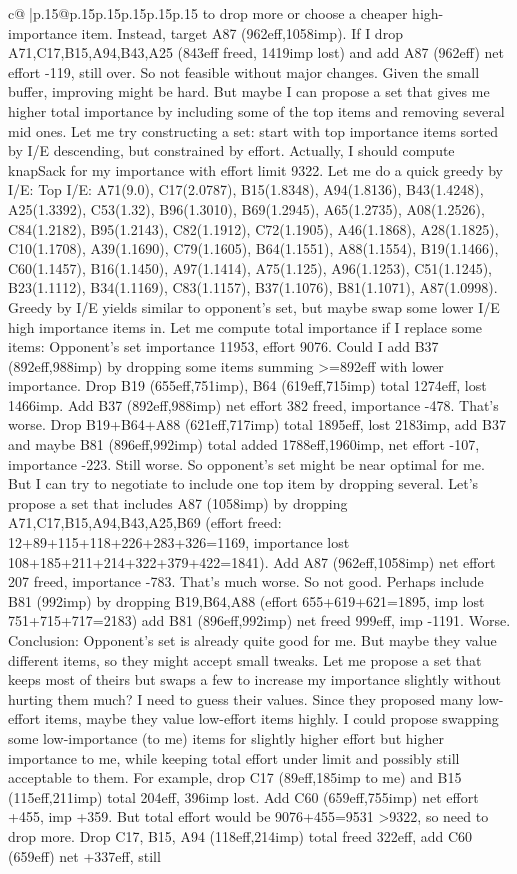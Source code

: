 \documentclass{article}
\begin{document}
{\begin{supertabular}{c@{$\;$}|p{.15\linewidth}@{}p{.15\linewidth}p{.15\linewidth}p{.15\linewidth}p{.15\linewidth}p{.15\linewidth}}
{{{to drop more or choose a cheaper high{-}importance item. Instead, target A87 (962eff,1058imp). If I drop A71,C17,B15,A94,B43,A25 (843eff freed, 1419imp lost) and add A87 (962eff) net effort {-}119, still over. So not feasible without major changes. Given the small buffer, improving might be hard. But maybe I can propose a set that gives me higher total importance by including some of the top items and removing several mid ones. Let me try constructing a set: start with top importance items sorted by I/E descending, but constrained by effort. Actually, I should compute knapSack for my importance with effort limit 9322. Let me do a quick greedy by I/E: Top I/E: A71(9.0), C17(2.0787), B15(1.8348), A94(1.8136), B43(1.4248), A25(1.3392), C53(1.32), B96(1.3010), B69(1.2945), A65(1.2735), A08(1.2526), C84(1.2182), B95(1.2143), C82(1.1912), C72(1.1905), A46(1.1868), A28(1.1825), C10(1.1708), A39(1.1690), C79(1.1605), B64(1.1551), A88(1.1554), B19(1.1466), C60(1.1457), B16(1.1450), A97(1.1414), A75(1.125), A96(1.1253), C51(1.1245), B23(1.1112), B34(1.1169), C83(1.1157), B37(1.1076), B81(1.1071), A87(1.0998). Greedy by I/E yields similar to opponent’s set, but maybe swap some lower I/E high importance items in. Let me compute total importance if I replace some items: Opponent’s set importance 11953, effort 9076. Could I add B37 (892eff,988imp) by dropping some items summing >=892eff with lower importance. Drop B19 (655eff,751imp), B64 (619eff,715imp) total 1274eff, lost 1466imp. Add B37 (892eff,988imp) net effort 382 freed, importance {-}478. That’s worse. Drop B19+B64+A88 (621eff,717imp) total 1895eff, lost 2183imp, add B37 and maybe B81 (896eff,992imp) total added 1788eff,1960imp, net effort {-}107, importance {-}223. Still worse. So opponent’s set might be near optimal for me. But I can try to negotiate to include one top item by dropping several. Let’s propose a set that includes A87 (1058imp) by dropping A71,C17,B15,A94,B43,A25,B69 (effort freed: 12+89+115+118+226+283+326=1169, importance lost 108+185+211+214+322+379+422=1841). Add A87 (962eff,1058imp) net effort 207 freed, importance {-}783. That’s much worse. So not good. Perhaps include B81 (992imp) by dropping B19,B64,A88 (effort 655+619+621=1895, imp lost 751+715+717=2183) add B81 (896eff,992imp) net freed 999eff, imp {-}1191. Worse. Conclusion: Opponent’s set is already quite good for me. But maybe they value different items, so they might accept small tweaks. Let me propose a set that keeps most of theirs but swaps a few to increase my importance slightly without hurting them much? I need to guess their values. Since they proposed many low{-}effort items, maybe they value low{-}effort items highly. I could propose swapping some low{-}importance (to me) items for slightly higher effort but higher importance to me, while keeping total effort under limit and possibly still acceptable to them. For example, drop C17 (89eff,185imp to me) and B15 (115eff,211imp) total 204eff, 396imp lost. Add C60 (659eff,755imp) net effort +455, imp +359. But total effort would be 9076+455=9531 >9322, so need to drop more. Drop C17, B15, A94 (118eff,214imp) total freed 322eff, add C60 (659eff) net +337eff, still }}}
\end{supertabular}}
\end{document}
